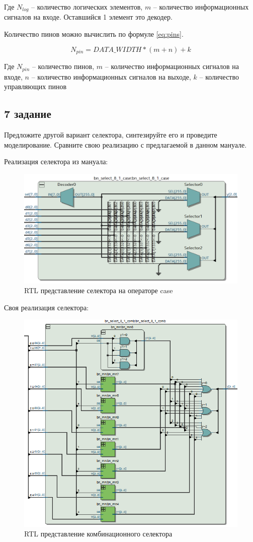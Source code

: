 \documentclass[a4paper,14pt]{article}
\begin{document}
Где $N_{log}$ -- количество логических элементов, $m$ -- количество информационных сигналов на входе. Оставшийся 1 элемент это декодер.

Количество пинов можно вычислить по формуле \ref{eq:pins}.

\begin{equation}
N_{pin} = DATA\_WIDTH * (m + n) + k
\label{eq:pins}
\end{equation}

Где $N_{pin}$ -- количество пинов, $m$ -- количество информационных сигналов на входе, $n$ -- количество информационных сигналов на выходе, $k$ -- количество управляющих пинов

\subsection{7 задание}

Предложите другой вариант селектора, синтезируйте его и проведите моделирование. Сравните свою реализацию с предлагаемой в данном мануале.

Реализация селектора из мануала:


\begin{figure}[H]
	\centering
	\includegraphics[width=0.6\linewidth]{img/z7_rtl_case}
	\caption{RTL представление селектора на операторе case}
	\label{fig:z7_rtl_case}
\end{figure}

Своя реализация селектора:


\begin{figure}[H]
	\centering
	\includegraphics[width=0.7\linewidth]{img/z7_rtl_comb}
	\caption{RTL представление комбинационного селектора}
	\label{fig:z7_rtl_comb}
\end{figure}
\end{document}
